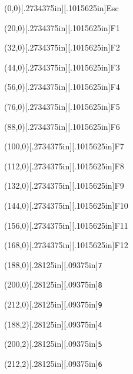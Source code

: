 \documentclass[12pt]{{memoir}}
\newcommand\keycaps[1]{\raisebox{0in}[.2734375in][.1015625in]{\tiny\textsf{#1}}}
\newcommand\keycapt[1]{\raisebox{0in}[.28125in][.09375in]{\texttt{#1}}}
\begin{document}
\setlength\TPHorizModule{.03125in}
\setlength\TPVertModule{.1875in}
\nopagebreak\begin{center}\nopagebreak
\begin{textblock}{12}(0,0)\keycaps{Esc}\end{textblock}
\begin{textblock}{12}(20,0)\keycaps{F1}\end{textblock}
\begin{textblock}{12}(32,0)\keycaps{F2}\end{textblock}
\begin{textblock}{12}(44,0)\keycaps{F3}\end{textblock}
\begin{textblock}{12}(56,0)\keycaps{F4}\end{textblock}
\begin{textblock}{12}(76,0)\keycaps{F5}\end{textblock}
\begin{textblock}{12}(88,0)\keycaps{F6}\end{textblock}
\begin{textblock}{12}(100,0)\keycaps{F7}\end{textblock}
\begin{textblock}{12}(112,0)\keycaps{F8}\end{textblock}
\begin{textblock}{12}(132,0)\keycaps{F9}\end{textblock}
\begin{textblock}{12}(144,0)\keycaps{F10}\end{textblock}
\begin{textblock}{12}(156,0)\keycaps{F11}\end{textblock}
\begin{textblock}{12}(168,0)\keycaps{F12}\end{textblock}
\begin{textblock}{12}(188,0)\keycapt{7}\end{textblock}
\begin{textblock}{12}(200,0)\keycapt{8}\end{textblock}
\begin{textblock}{12}(212,0)\keycapt{9}\end{textblock}
\begin{textblock}{12}(188,2)\keycapt{4}\end{textblock}
\begin{textblock}{12}(200,2)\keycapt{5}\end{textblock}
\begin{textblock}{12}(212,2)\keycapt{6}\end{textblock}

\end{center}
\end{document}
